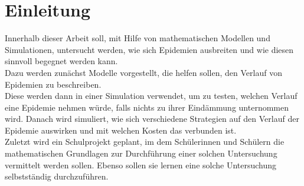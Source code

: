 \section{Einleitung}

Innerhalb dieser Arbeit soll, mit Hilfe von mathematischen Modellen und Simulationen, untersucht werden, wie sich Epidemien ausbreiten und wie diesen sinnvoll begegnet werden kann.\\
Dazu werden zunächst Modelle vorgestellt, die helfen sollen, den Verlauf von Epidemien zu beschreiben.\\
Diese werden dann in einer Simulation verwendet, um zu testen, welchen Verlauf eine Epidemie nehmen würde, falls nichts zu ihrer Eindämmung unternommen wird. Danach wird simuliert, wie sich verschiedene Strategien auf den Verlauf der Epidemie auswirken und mit welchen Kosten das verbunden ist.\\
Zuletzt wird ein Schulprojekt geplant, im dem Schülerinnen und Schülern die mathematischen Grundlagen zur Durchführung einer solchen Untersuchung vermittelt werden sollen. Ebenso sollen sie lernen eine solche Untersuchung selbstständig durchzuführen. 